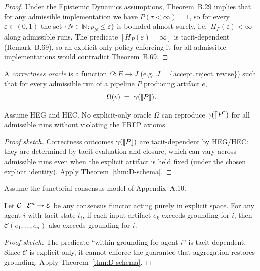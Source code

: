 \begin{proof}
Under the Epistemic Dynamics assumptions, Theorem~B.29 implies that for any admissible
implementation we have $P(\tau < \infty) = 1$, so for every $\varepsilon \in (0,1)$
the set $\{N \in \mathbb{N} : p_N \le \varepsilon\}$ is bounded almost surely, i.e.\
$H_P(\varepsilon) < \infty$ along admissible runs. The predicate
$[H_P(\varepsilon) = \infty]$ is tacit-dependent (Remark~B.69), so an explicit-only
policy enforcing it for all admissible implementations would contradict
Theorem~B.69.
\end{proof}


\begin{definition}
A \emph{correctness oracle} is a function $\Omega:E\to J$ (e.g. $J=\{\mathrm{accept},\mathrm{reject},\mathrm{revise}\}$) such that for every admissible run of a pipeline $P$ producing artifact $e$,
\[
\Omega(e)\;=\;\gamma(\llbracket P \rrbracket).
\]
\end{definition}

\begin{corollary}\label{cor:D-no-oracle}
Assume HEG and HEC. No explicit-only oracle $\Omega$ can reproduce $\gamma(\llbracket P \rrbracket)$ for all admissible runs without violating the FRFP axioms.
\end{corollary}

\begin{proof}[Proof sketch]
Correctness outcomes $\gamma(\llbracket P \rrbracket)$ are tacit-dependent by HEG/HEC: they are determined by tacit evaluation and closure, which can vary across admissible runs even when the explicit artifact is held fixed (under the chosen explicit identity). Apply Theorem~\ref{thm:D-schema}.
\end{proof}

Assume the functorial consensus model of Appendix~A.10.

\begin{corollary}\label{cor:D-no-consensus-grounding}
Let $\mathcal{C}:\mathcal{E}^n\to\mathcal{E}$ be any consensus functor acting purely in explicit space. For any agent $i$ with tacit state $t_i$, if each input artifact $e_k$ exceeds grounding for $i$, then $\mathcal{C}(e_1,\dots,e_n)$ also exceeds grounding for $i$.
\end{corollary}

\begin{proof}[Proof sketch]
The predicate ``within grounding for agent $i$'' is tacit-dependent. Since $\mathcal{C}$ is explicit-only, it cannot enforce the guarantee that aggregation restores grounding. Apply Theorem~\ref{thm:D-schema}.
\end{proof}

